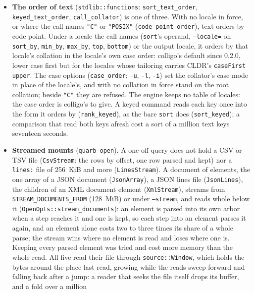 \documentclass{report}
\begin{document}
\begin{itemize}
  \texttt{navigator.language} would be their system layer).
\item \textbf{The order of text} (\texttt{stdlib::functions}:
  \texttt{sort\_text\_order}, \texttt{keyed\_text\_order},
  \texttt{call\_collator}) is one of three. With no locale in force,
  or where the call names \texttt{"C"} or \texttt{"POSIX"}
  (\texttt{code\_point\_order}), text orders by code point. Under a
  locale the call names (\texttt{sort}'s operand, \texttt{--locale=}
  on \texttt{sort\_by}, \texttt{min\_by}, \texttt{max\_by},
  \texttt{top}, \texttt{bottom}) or the output locale, it orders by
  that locale's collation in the locale's own case order: colligo's
  default since 0.2.0, lower case first but for the locales whose
  tailoring carries CLDR's \texttt{caseFirst upper}. The case options
  (\texttt{case\_order}: \texttt{-u}, \texttt{-l}, \texttt{-i})
  set the collator's case mode in place of the locale's, and with no
  collation in force stand on the root collation; beside
  \texttt{"C"} they are refused. The engine keeps no table of
  locales: the case order is colligo's to give. A keyed command reads
  each key once into the form it orders by (\texttt{rank\_keyed}),
  as the bare \texttt{sort} does (\texttt{sort\_keyed}); a
  comparison that read both keys afresh cost a sort of a million text
  keys seventeen seconds.
\item \textbf{Streamed mounts} (\texttt{quarb-open}). A one-off
  query does not hold a CSV or TSV file (\texttt{CsvStream}: the
  rows by offset, one row parsed and kept) nor a
  \texttt{lines:} file of 256~KiB and more
  (\texttt{LinesStream}). A document of elements, the one array of a
  JSON document (\texttt{JsonArray}), a JSON lines file
  (\texttt{JsonLines}), the children of an XML document element
  (\texttt{XmlStream}), streams from
  \texttt{STREAM\_DOCUMENTS\_FROM} (128~MiB) or under
  \texttt{--stream}, and reads whole below it
  (\texttt{OpenOpts::stream\_documents}): an element is parsed into
  its own arbor when a step reaches it and one is kept, so each step
  into an element parses it again, and an element alone costs two to
  three times its share of a whole parse; the stream wins where no
  element is read and loses where one is. Keeping every parsed
  element was tried and cost more memory than the whole read. All
  five read their file through \texttt{source::Window}, which holds
  the bytes around the place last read, growing while the reads
  sweep forward and falling back after a jump: a reader that seeks
  the file itself drops its buffer, and a fold over a million

\end{itemize}
\end{document}
